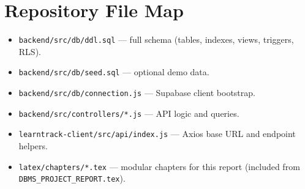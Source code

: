 \chapter{Repository File Map}
\begin{itemize}[leftmargin=*]
  \item \texttt{backend/src/db/ddl.sql} --- full schema (tables, indexes, views, triggers, RLS).

  \item \texttt{backend/src/db/seed.sql} --- optional demo data.

  \item \texttt{backend/src/db/connection.js} --- Supabase client bootstrap.

  \item \texttt{backend/src/controllers/*.js} --- API logic and queries.

  \item \texttt{learntrack-client/src/api/index.js} --- Axios base URL and endpoint helpers.

  \item \texttt{latex/chapters/*.tex} --- modular chapters for this report (included from \texttt{DBMS\_PROJECT\_REPORT.tex}).

\end{itemize}
